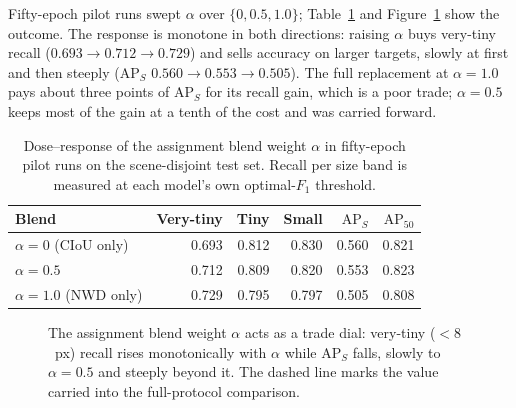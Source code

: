 Fifty-epoch pilot runs swept $\alpha$ over $\{0, 0.5, 1.0\}$; Table~\ref{tab:alpha}
and Figure~\ref{fig:alphadose} show the outcome. The response is monotone in both
directions: raising $\alpha$ buys very-tiny recall ($0.693 \to 0.712 \to 0.729$)
and sells accuracy on larger targets, slowly at first and then steeply
($\mathrm{AP}_S$ $0.560 \to 0.553 \to 0.505$). The full replacement at
$\alpha=1.0$ pays about three points of $\mathrm{AP}_S$ for its recall gain,
which is a poor trade; $\alpha=0.5$ keeps most of the gain at a tenth of the
cost and was carried forward.

\begin{table}[tbp]
  \centering
  \caption{Dose--response of the assignment blend weight $\alpha$ in fifty-epoch
  pilot runs on the scene-disjoint test set. Recall per size band is measured at
  each model's own optimal-$F_1$ threshold.}
  \label{tab:alpha}
  \begin{tabular}{@{}l r r r r r@{}}
    \toprule
    Blend & Very-tiny & Tiny & Small & $\mathrm{AP}_S$ & $\mathrm{AP}_{50}$ \\
    \midrule
    $\alpha=0$ (CIoU only) & 0.693 & 0.812 & 0.830 & 0.560 & 0.821 \\
    $\alpha=0.5$           & 0.712 & 0.809 & 0.820 & 0.553 & 0.823 \\
    $\alpha=1.0$ (NWD only) & 0.729 & 0.795 & 0.797 & 0.505 & 0.808 \\
    \bottomrule
  \end{tabular}
\end{table}

\begin{figure}[tbp]
  \centering
  \caption{The assignment blend weight $\alpha$ acts as a trade dial: very-tiny
  ($<8$~px) recall rises monotonically with $\alpha$ while $\mathrm{AP}_S$ falls,
  slowly to $\alpha=0.5$ and steeply beyond it. The dashed line marks the value
  carried into the full-protocol comparison.}
  \label{fig:alphadose}
\end{figure}

